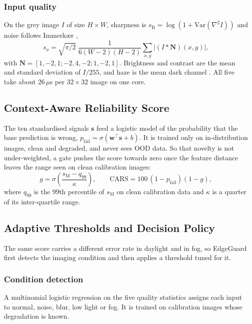 \documentclass[conference]{IEEEtran}
\begin{document}
\subsubsection{Input quality}
On the grey image $I$ of size $H\times W$, sharpness is $s_{\text{B}}=\log(1+\mathrm{Var}(\nabla^{2}I))$ \cite{pechpacheco2000autofocus} and noise follows Immerkær \cite{immerkaer1996noise},
\begin{equation}
s_{\sigma}=\sqrt{\pi/2}\;\frac{1}{6(W-2)(H-2)}\sum_{x,y}\bigl|(I*\mathbf{N})(x,y)\bigr|,
\label{eq:noise}
\end{equation}
with $\mathbf{N}=[1,-2,1;-2,4,-2;1,-2,1]$. Brightness and contrast are the mean and standard deviation of $I/255$, and haze is the mean dark channel \cite{he2009darkchannel}. All five take about 26\,$\mu$s per $32\times32$ image on one core.

\subsection{Context-Aware Reliability Score}

The ten standardised signals $\mathbf{s}$ feed a logistic model of the probability that the base prediction is wrong, $p_{\text{fail}}=\sigma(\mathbf{w}^{\top}\mathbf{s}+b)$. It is trained only on in-distribution images, clean and degraded, and never sees OOD data. So that novelty is not under-weighted, a gate pushes the score towards zero once the feature distance leaves the range seen on clean calibration images:
\begin{equation}
g=\sigma\!\left(\frac{s_{\text{M}}-q_{99}}{\kappa}\right),\qquad \text{CARS}=100\,(1-p_{\text{fail}})(1-g),
\label{eq:cars}
\end{equation}
where $q_{99}$ is the 99th percentile of $s_{\text{M}}$ on clean calibration data and $\kappa$ is a quarter of its inter-quartile range.

\subsection{Adaptive Thresholds and Decision Policy}

The same score carries a different error rate in daylight and in fog, so EdgeGuard first detects the imaging condition and then applies a threshold tuned for it.

\subsubsection{Condition detection}
A multinomial logistic regression on the five quality statistics assigns each input to normal, noise, blur, low light or fog. It is trained on calibration images whose degradation is known.
\end{document}
